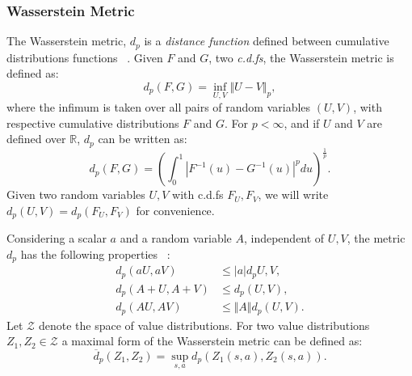 \subsubsection{Wasserstein Metric}
The Wasserstein metric, $d_p$ is a \emph{distance function} defined between cumulative distributions functions ~\cite{bootstrapAsymptotic}. Given $F$ and $G$, two \emph{c.d.fs}, the Wasserstein metric is defined as:
\begin{equation}
	d_p(F,G)= \inf_{U,V}\Vert U-V\Vert_p,
\end{equation}  
where the infimum is taken over all pairs of random variables $(U,V)$, with respective cumulative distributions $F$ and $G$. For $p< \infty$, and if $U$ and $V$ are defined over $\mathbb{R}$, $d_p$ can be written as:
\begin{equation}
	d_p(F,G)=\left(\int_{0}^{1} |F^{-1}(u)-G^{-1}(u)|^p du \right)^{\frac{1}{p}}.
\end{equation}
Given two random variables $U,V$ with c.d.fs $F_U,F_V$, we will write $d_p(U,V)=d_p(F_U,F_V)$ for convenience.\par
Considering a scalar $a$ and a random variable $A$, independent of $U,V$, the metric $d_p$ has the following properties ~\cite{DBLP:journals/corr/BellemareDM17}:
\begin{equation*}
\begin{split}
		d_p(aU,aV) & \leq \vert a \vert d_p{U,V}, \\
		d_p(A+U,A+V) &  \leq d_p(U,V), \\
		d_p(AU,AV) & \leq \Vert A \Vert d_p(U,V).
\end{split}
\end{equation*}
Let $\mathcal{Z}$ denote the space of value distributions. For two value distributions $Z_1, Z_2 \in \mathcal{Z}$ a maximal form of the Wasserstein metric can be defined as: 
\begin{equation}
	\overline{d}_p(Z_1,Z_2)= \sup_{s,a} d_p(Z_1(s,a),Z_2(s,a)).
\end{equation}
